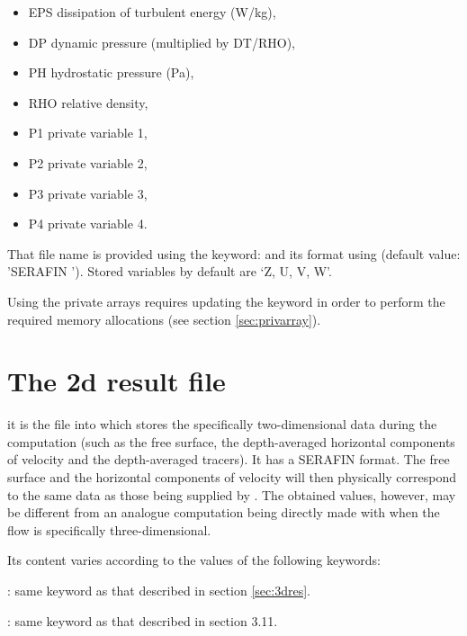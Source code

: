 \begin{itemize}
\item EPS dissipation of turbulent energy (W/kg),

\item DP dynamic pressure (multiplied by DT/RHO),

\item PH hydrostatic pressure (Pa),

\item RHO relative density,

\item P1 private variable 1,

\item P2 private variable 2,

\item P3 private variable 3,

\item P4 private variable 4.
\end{itemize}

That file name is provided using the keyword:  and its
format using  (default value: 'SERAFIN '). Stored
variables by default are `Z, U, V, W'.

Using the private arrays requires updating the keyword  in order to perform the required memory allocations (see
section \ref{sec:privarray}).

\section{The 2d result file}

it is the file into which  stores the specifically two-dimensional
data during the computation (such as the free surface, the depth-averaged
horizontal components of velocity and the depth-averaged tracers). It has a
SERAFIN format. The free surface and the horizontal components of velocity will
then physically correspond to the same data as those being supplied by
. The obtained values, however, may be different from an analogue
computation being directly made with  when the flow is specifically
three-dimensional.

Its content varies according to the values of the following keywords:

: same keyword as that
described in section \ref{sec:3dres}.

: same keyword as that described in section
3.11.

